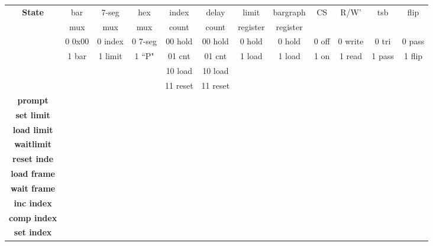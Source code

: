 \documentclass{article}[10 pt,landscape]
\begin{document}
\begin{landscape}
    \begin{table}
        {\small
            \begin{tabular}{c||c|c|c|c|c|c|c|c|c|c|c}
                {\bf State }     & bar & 7-seg & hex & index & delay & limit    & bargraph & CS & R/W' & tsb & flip \\
                & mux & mux   & mux & count & count & register & register &       &       & &      \\  \hline \hline
                & 0 0x00 & 0 index & 0 7-seg & 00 hold & 00 hold & 0 hold & 0 hold & 0 off & 0 write & 0 tri & 0 pass \\
                & 1 bar    & 1 limit & 1 ``P"& 01 cnt & 01 cnt & 1 load &    1 load & 1 on    &  1 read & 1
                pass & 1 flip \\
                &     &     &     & 10 load & 10 load & & & & & \\
                &     &     &        & 11 reset    & 11 reset & & & & \\ \hline \hline
                {\bf prompt }      &       &      &      &       &       &      &      &      &   &      &   \\ \hline
                {\bf set limit }  &       &      &      &       &       &      &      &      &   &      &   \\ \hline
                {\bf load limit } &      &      &      &       &       &      &      &      &   &      &   \\ \hline
                {\bf waitlimit } &      &      &      &       &       &      &      &      &   &      &   \\ \hline
                {\bf reset inde  } &      &      &       &       &       &      &      &      &   &      &   \\ \hline
                {\bf load frame } &      &      &      &       &       &      &      &      &   &   &   \\ \hline
                {\bf wait frame } &      &      &      &       &       &      &      &      &   &      &   \\ \hline
                {\bf inc index } &      &      &      &       &       &      &      &      &   &      &   \\ \hline
                {\bf comp index } &      &      &      &       &       &      &      &      &   &      &   \\ \hline
                {\bf set index } &      &      &      &       &        &      &       &      &   &      &   \\ \hline

\end{tabular}}
\end{table}
\end{landscape}
\end{document}
